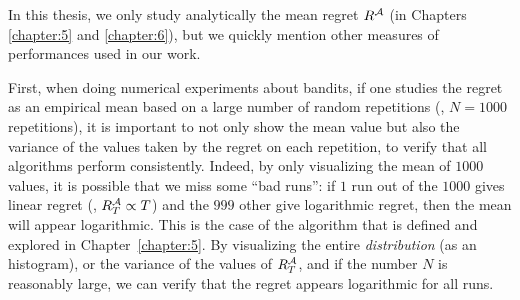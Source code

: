 In this thesis, we only study analytically the mean regret $R^{\mathcal{A}}$ (in Chapters \ref{chapter:5} and \ref{chapter:6}), but we quickly mention other measures of performances used in our work.

First, when doing numerical experiments about bandits, if one studies the regret as an empirical mean based on a large number of random repetitions (\eg, $N=1000$ repetitions), it is important to not only show the mean value but also the variance of the values taken by the regret on each repetition, to verify that all algorithms perform consistently.
Indeed, by only visualizing the mean of $1000$ values, it is possible that we miss some ``bad runs'': if $1$ run out of the $1000$ gives linear regret (\ie, $R_T^{\mathcal{A}} \propto T$) and the $999$ other give logarithmic regret, then the mean will appear logarithmic.
This is the case of the \Selfish{} algorithm that is defined and explored in Chapter~\ref{chapter:5}.
By visualizing the entire \emph{distribution} (as an histogram), or the variance of the values of $R_T^{\mathcal{A}}$, and if the number $N$ is reasonably large, we can verify that the regret appears logarithmic for all runs.


